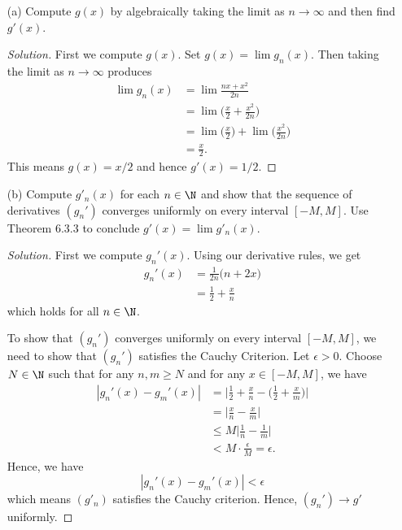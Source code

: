 \begin{enumerate}
    \item[(a)] Compute \( g(x)  \) by algebraically taking the limit as \( n \to \infty  \) and then find \( g'(x)  \).
        \begin{proof}[Solution]
        First we compute \( g(x)  \). Set \( g(x) = \lim g_n(x)  \). Then taking the limit as \( n \to \infty  \) produces 
        \begin{align*}
            \lim g_n(x) &= \lim \frac{ nx + x^2 }{ 2n }  \\
                        &= \lim \Big( \frac{ x }{ 2 } + \frac{ x^2 }{ 2n }  \Big)\\
                        &= \lim \Big( \frac{ x  }{ 2 }  \Big) + \lim \Big( \frac{ x^2 }{ 2n }  \Big) \\
                        &= \frac{ x }{ 2 }.
        \end{align*}
        This means \( g(x) = x / 2  \) and hence \( g'(x) = 1 / 2  \).
        \end{proof}
    \item[(b)] Compute \( g'_n(x)  \) for each \( n \in \N  \) and show that the sequence of derivatives \( (g_n')  \) converges uniformly on every interval \( [-M,M ] \). Use Theorem 6.3.3 to conclude \( g'(x) = \lim g'_n(x)  \).
        \begin{proof}[Solution]
        First we compute \( g_n'(x) \). Using our derivative rules, we get 
        \begin{align*}
            g_n'(x) &= \frac{ 1 }{ 2n } \Big( n + 2x \Big) \\
                    &= \frac{ 1 }{ 2 } + \frac{ x }{ n }
        \end{align*}
        which holds for all \( n \in \N  \).

        To show that \( (g_n') \) converges uniformly on every interval \( [-M, M ] \), we need to show that \( (g_n')  \) satisfies the Cauchy Criterion. Let \( \epsilon > 0  \). Choose \( N \in \N  \) such that for any \( n,m \geq N  \) and for any \( x \in [-M,M] \), we have 
        \begin{align*}
           | g_n'(x) - g_m'(x)  |  &= \Big| \frac{ 1 }{ 2 } + \frac{ x }{ n } - \Big( \frac{ 1 }{ 2 } + \frac{ x }{ m }  \Big) \Big|  \\
                                   &= \Big| \frac{ x }{ n } - \frac{ x }{ m }  \Big| \\ 
                                   &\leq M \Big| \frac{ 1  }{ n  } - \frac{ 1  }{ m }  \Big| \\
                                   &< M \cdot \frac{ \epsilon  }{ M  } = \epsilon.
        \end{align*}
        Hence, we have 
        \[  | g_n'(x) - g_m'(x)  | < \epsilon \]
        which means \( (g'_n)  \) satisfies the Cauchy criterion. Hence, \( (g_n') \to g' \) uniformly.
        \end{proof}
\end{enumerate}




